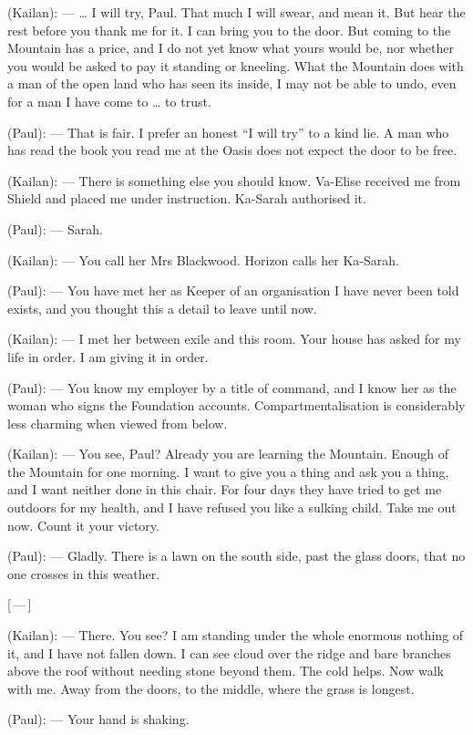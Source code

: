 \begin{room}
(Kailan): --- \ldots{} I will try, Paul. That much I will swear, and mean it. But hear the rest before you thank me for it. I can bring you to the door. But coming to the Mountain has a price, and I do not yet know what yours would be, nor whether you would be asked to pay it standing or kneeling. What the Mountain does with a man of the open land who has seen its inside, I may not be able to undo, even for a man I have come to \ldots{} to trust.

(Paul): --- That is fair. I prefer an honest ``I will try'' to a kind lie. A man who has read the book you read me at the Oasis does not expect the door to be free.

(Kailan): --- There is something else you should know. Va-Elise received me from Shield and placed me under instruction. Ka-Sarah authorised it.

(Paul): --- Sarah.

(Kailan): --- You call her Mrs Blackwood. Horizon calls her Ka-Sarah.

(Paul): --- You have met her as Keeper of an organisation I have never been told exists, and you thought this a detail to leave until now.

(Kailan): --- I met her between exile and this room. Your house has asked for my life in order. I am giving it in order.

(Paul): --- You know my employer by a title of command, and I know her as the woman who signs the Foundation accounts. Compartmentalisation is considerably less charming when viewed from below.

(Kailan): --- You see, Paul? Already you are learning the Mountain. Enough of the Mountain for one morning. I want to give you a thing and ask you a thing, and I want neither done in this chair. For four days they have tried to get me outdoors for my health, and I have refused you like a sulking child. Take me out now. Count it your victory.

(Paul): --- Gladly. There is a lawn on the south side, past the glass doors, that no one crosses in this weather.

\centerline{[\,---\,]}

(Kailan): --- There. You see? I am standing under the whole enormous nothing of it, and I have not fallen down. I can see cloud over the ridge and bare branches above the roof without needing stone beyond them. The cold helps. Now walk with me. Away from the doors, to the middle, where the grass is longest.

(Paul): --- Your hand is shaking.


\end{room}
